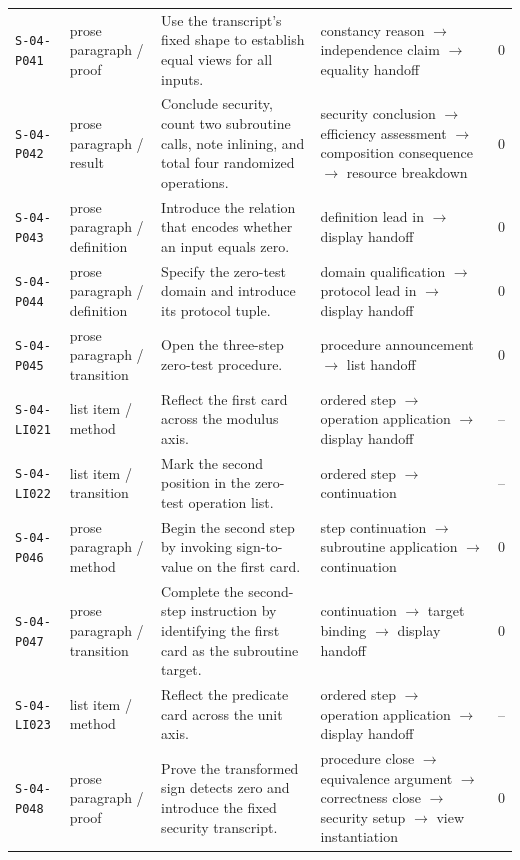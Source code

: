 \documentclass[10pt]{article}
\begin{document}
\begin{longtable}{@{}p{}p{}p{}p{}p{}@{}}
\texttt{S-04-P041}&prose paragraph / proof&Use the transcript's fixed shape to establish equal views for all inputs.&constancy reason $\rightarrow$ independence claim $\rightarrow$ equality handoff&0\\
\texttt{S-04-P042}&prose paragraph / result&Conclude security, count two subroutine calls, note inlining, and total four randomized operations.&security conclusion $\rightarrow$ efficiency assessment $\rightarrow$ composition consequence $\rightarrow$ resource breakdown&0\\
\texttt{S-04-P043}&prose paragraph / definition&Introduce the relation that encodes whether an input equals zero.&definition lead in $\rightarrow$ display handoff&0\\
\texttt{S-04-P044}&prose paragraph / definition&Specify the zero-test domain and introduce its protocol tuple.&domain qualification $\rightarrow$ protocol lead in $\rightarrow$ display handoff&0\\
\texttt{S-04-P045}&prose paragraph / transition&Open the three-step zero-test procedure.&procedure announcement $\rightarrow$ list handoff&0\\
\texttt{S-04-LI021}&list item / method&Reflect the first card across the modulus axis.&ordered step $\rightarrow$ operation application $\rightarrow$ display handoff&--\\
\texttt{S-04-LI022}&list item / transition&Mark the second position in the zero-test operation list.&ordered step $\rightarrow$ continuation&--\\
\texttt{S-04-P046}&prose paragraph / method&Begin the second step by invoking sign-to-value on the first card.&step continuation $\rightarrow$ subroutine application $\rightarrow$ continuation&0\\
\texttt{S-04-P047}&prose paragraph / transition&Complete the second-step instruction by identifying the first card as the subroutine target.&continuation $\rightarrow$ target binding $\rightarrow$ display handoff&0\\
\texttt{S-04-LI023}&list item / method&Reflect the predicate card across the unit axis.&ordered step $\rightarrow$ operation application $\rightarrow$ display handoff&--\\
\texttt{S-04-P048}&prose paragraph / proof&Prove the transformed sign detects zero and introduce the fixed security transcript.&procedure close $\rightarrow$ equivalence argument $\rightarrow$ correctness close $\rightarrow$ security setup $\rightarrow$ view instantiation&0\\

\end{longtable}
\end{document}
